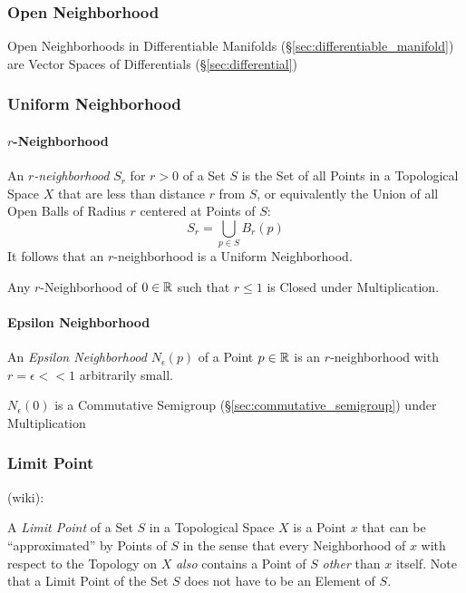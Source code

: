 \subsubsection{Open Neighborhood}\label{sec:open_neighborhood}

Open Neighborhoods in Differentiable Manifolds
(\S\ref{sec:differentiable_manifold}) are Vector Spaces of Differentials
(\S\ref{sec:differential})



\subsubsection{Uniform Neighborhood}\label{sec:uniform_neighborhood}

\paragraph{$r$-Neighborhood}\label{sec:r_neighborhood}\hfill

An \emph{$r$-neighborhood} $S_r$ for $r > 0$ of a Set $S$ is the Set of all
Points in a Topological Space $X$ that are less than distance $r$ from $S$, or
equivalently the Union of all Open Balls of Radius $r$ centered at Points of
$S$:
\[
  S_r = \bigcup_{p \in S} B_r (p)
\]
It follows that an $r$-neighborhood is a Uniform Neighborhood.

Any $r$-Neighborhood of $0 \in \mathbb{R}$ such that $r \leq 1$ is Closed under
Multiplication.



\paragraph{Epsilon Neighborhood}\label{sec:epsilon_neighborhood}\hfill

An \emph{Epsilon Neighborhood} $N_\epsilon(p)$ of a Point $p \in \mathbb{R}$ is an
$r$-neighborhood with $r = \epsilon << 1$ arbitrarily small.

$N_\epsilon(0)$ is a Commutative Semigroup (\S\ref{sec:commutative_semigroup})
under Multiplication



\subsubsection{Limit Point}\label{sec:limit_point}

(wiki):

A \emph{Limit Point} of a Set $S$ in a Topological Space $X$ is a Point $x$
that can be ``approximated'' by Points of $S$ in the sense that every
Neighborhood of $x$ with respect to the Topology on $X$ \emph{also} contains a
Point of $S$ \emph{other} than $x$ itself. Note that a Limit Point of the Set
$S$ does not have to be an Element of $S$.

